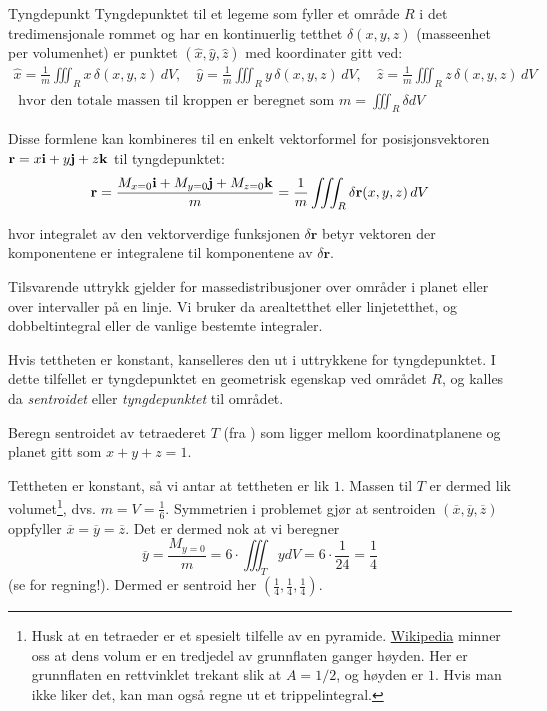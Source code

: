 \begin{defn}{Tyngdepunkt}
Tyngdepunktet til et legeme som fyller et område \( R \) i det tredimensjonale rommet og har en kontinuerlig tetthet \( \delta(x, y, z) \) (masseenhet per volumenhet) er punktet \( (\hat{x}, \hat{y}, \hat{z}) \) med koordinater gitt ved:
\begin{align*}
\hat{x} = \frac{1}{m} \iiint_R x \, \delta(x, y, z)\, dV, \quad
\hat{y} = \frac{1}{m} \iiint_R y \, \delta(x, y, z)\, dV, \quad
\hat{z} = \frac{1}{m} \iiint_R z \, \delta(x, y, z)\, dV\\
\text{ hvor den totale massen til kroppen er beregnet som }m = \iiint_R \delta dV
\end{align*}
\end{defn}
Disse formlene kan kombineres til en enkelt vektorformel for posisjonsvektoren \( \mathbf{r} = x\mathbf{i} + y\mathbf{j} + z\mathbf{k} \) til tyngdepunktet:
\[
\mathbf{r} = \frac{M_{x=0}\mathbf{i}+M_{y=0}\mathbf{j}+M_{z=0}\mathbf{k}}{m}=\frac{1}{m} \iiint_R \delta\mathbf{r}(x, y, z)\, dV
\]

hvor integralet av den vektorverdige funksjonen \( \delta \mathbf{r} \) betyr vektoren der komponentene er integralene til komponentene av \( \delta \mathbf{r} \).

\begin{rem}{}
Tilsvarende uttrykk gjelder for massedistribusjoner over områder i planet eller over intervaller på en linje. Vi bruker da arealtetthet eller linjetetthet, og dobbeltintegral eller de vanlige bestemte integraler.

Hvis tettheten er konstant, kanselleres den ut i uttrykkene for tyngdepunktet. I dette tilfellet er tyngdepunktet en geometrisk egenskap ved området \( R \), og kalles da \emph{sentroidet} eller \emph{tyngdepunktet} til området. 
\end{rem}

\begin{eks}{}
Beregn sentroidet av tetraederet $T$ (fra ) som ligger mellom koordinatplanene og planet gitt som $x+y+z=1$.

Tettheten er konstant, så vi antar at tettheten er lik $1$. Massen til $T$ er dermed lik volumet\footnote{Husk at en tetraeder er et spesielt tilfelle av en pyramide. \href{https://no.wikipedia.org/wiki/Pyramide}{Wikipedia} minner oss at dens volum er en tredjedel av grunnflaten ganger høyden. Her er grunnflaten en rettvinklet trekant slik at $A=1/2$, og høyden er $1$. Hvis man ikke liker det, kan man også regne ut et trippelintegral.}, dvs. $m=V=\frac{1}{6}$. Symmetrien i problemet gjør at sentroiden $(\overline{x},\overline{y},\overline{z})$ oppfyller $\overline{x}=\overline{y}=\overline{z}$. Det er dermed nok at vi beregner 
\[\overline{y}=\frac{M_{y=0}}{m} = 6 \cdot \iiint_T y dV = 6 \cdot \frac{1}{24} =  \frac{1}{4}\]
(se  for regning!). Dermed er sentroid her $(\tfrac{1}{4},\tfrac{1}{4},\tfrac{1}{4})$.
\end{eks}

